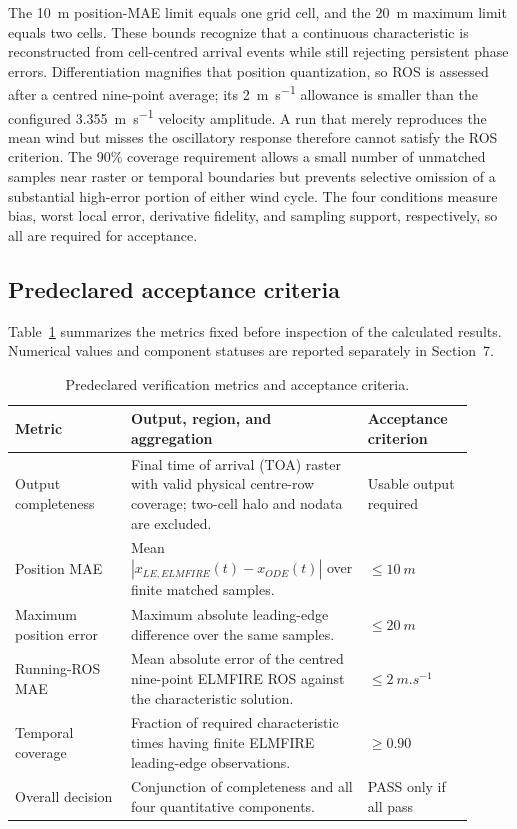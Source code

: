 The \SI{10}{m} position-MAE limit equals one grid cell, and the
\SI{20}{m} maximum limit equals two cells.  These bounds recognize that a
continuous characteristic is reconstructed from cell-centred arrival events
while still rejecting persistent phase errors.  Differentiation magnifies that
position quantization, so ROS is assessed after a centred nine-point average;
its \SI{2}{m.s^{-1}} allowance is smaller than the configured
\SI{3.355}{m.s^{-1}} velocity amplitude.  A run that merely reproduces the
mean wind but misses the oscillatory response therefore cannot satisfy the ROS
criterion.  The 90\% coverage requirement allows a small number of unmatched
samples near raster or temporal boundaries but prevents selective omission of
a substantial high-error portion of either wind cycle.  The four conditions
measure bias, worst local error, derivative fidelity, and sampling support,
respectively, so all are required for acceptance.

\subsection{Predeclared acceptance criteria}

Table~\ref{tab:acceptance-contract} summarizes the metrics fixed before
inspection of the calculated results. Numerical values and component statuses
are reported separately in Section~7.

\begin{table}[H]
\centering
\footnotesize
\caption{Predeclared verification metrics and acceptance criteria.}
\label{tab:acceptance-contract}
\begin{tabular}{@{}p{0.23\linewidth}p{0.47\linewidth}p{0.21\linewidth}@{}}
\toprule
Metric & Output, region, and aggregation & Acceptance criterion\\
\midrule
Output completeness & Final time of arrival (TOA) raster with valid physical centre-row coverage; two-cell halo and nodata are excluded. & Usable output required \\
Position MAE & Mean \(|x_{LE,ELMFIRE}(t)-x_{ODE}(t)|\) over finite matched samples. & \(\le\SI{10}{m}\) \\
Maximum position error & Maximum absolute leading-edge difference over the same samples. & \(\le\SI{20}{m}\) \\
Running-ROS MAE & Mean absolute error of the centred nine-point ELMFIRE ROS against the characteristic solution. & \(\le\SI{2}{m.s^{-1}}\) \\
Temporal coverage & Fraction of required characteristic times having finite ELMFIRE leading-edge observations. & \(\ge0.90\) \\
Overall decision & Conjunction of completeness and all four quantitative components. & PASS only if all pass \\
\bottomrule
\end{tabular}
\end{table}

